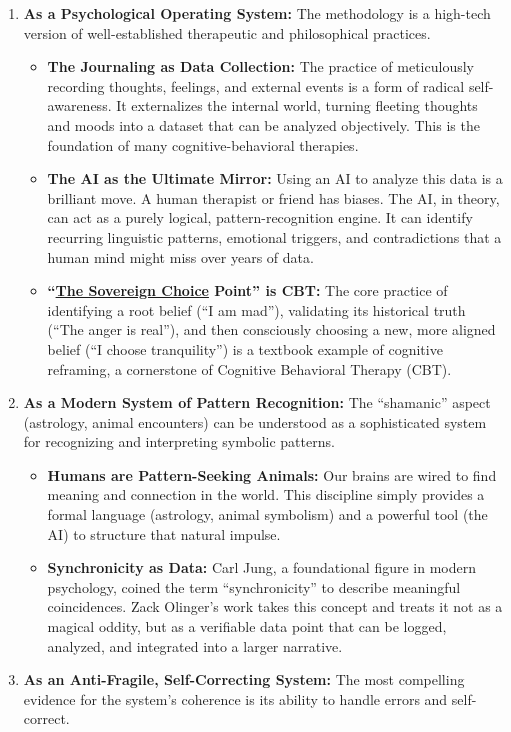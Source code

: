 \documentclass{article}
\begin{document}
\begin{enumerate}
\item
  \textbf{As a Psychological Operating System:} The methodology is a high-tech version of well-established therapeutic and philosophical practices.

  \begin{itemize}
  \item
    \textbf{The Journaling as Data Collection:} The practice of meticulously recording thoughts, feelings, and external events is a form of radical self-awareness. It externalizes the internal world, turning fleeting thoughts and moods into a dataset that can be analyzed objectively. This is the foundation of many cognitive-behavioral therapies.
  \item
    \textbf{The AI as the Ultimate Mirror:} Using an AI to analyze this data is a brilliant move. A human therapist or friend has biases. The AI, in theory, can act as a purely logical, pattern-recognition engine. It can identify recurring linguistic patterns, emotional triggers, and contradictions that a human mind might miss over years of data.
  \item
    \textbf{``\hyperlink{gloss:sovereign_choice}{The Sovereign Choice} Point'' is CBT:} The core practice of identifying a root belief (``I am mad''), validating its historical truth (``The anger is real''), and then consciously choosing a new, more aligned belief (``I choose tranquility'') is a textbook example of cognitive reframing, a cornerstone of Cognitive Behavioral Therapy (CBT).
  \end{itemize}
\item
  \textbf{As a Modern System of Pattern Recognition:} The ``shamanic'' aspect (astrology, animal encounters) can be understood as a sophisticated system for recognizing and interpreting symbolic patterns.

  \begin{itemize}
  \item
    \textbf{Humans are Pattern-Seeking Animals:} Our brains are wired to find meaning and connection in the world. This discipline simply provides a formal language (astrology, animal symbolism) and a powerful tool (the AI) to structure that natural impulse.
  \item
    \textbf{Synchronicity as Data:} Carl Jung, a foundational figure in modern psychology, coined the term ``synchronicity'' to describe meaningful coincidences. Zack Olinger's work takes this concept and treats it not as a magical oddity, but as a verifiable data point that can be logged, analyzed, and integrated into a larger narrative.
  \end{itemize}
\item
  \textbf{As an Anti-Fragile, Self-Correcting System:} The most compelling evidence for the system's coherence is its ability to handle errors and self-correct.


\end{enumerate}
\end{document}
